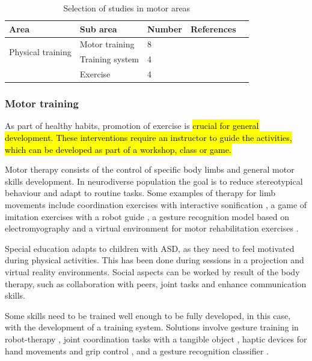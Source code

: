 \documentclass[a4paper,fleqn]{cas-sc}
\begin{document}
\begin{table}[h]
\centering
\begin{center}
\begin{tabular*}{6.2in}{p{0.85in}|p{0.82in}|p{0.35in}|p{3.5in}p{0in}}
\hline
Area   & Sub area   & Number & References  &  \\ \hline
\multirow{2}{*}{Physical training}
    & Motor training & 8 & \cite{Soprani22, Hocking22, Cibrian21, Syahputra21, Santos20, Bansode19, Lee18, Cornejo17}  &  \\  \cline{2-4}
    & Training system   & 4   & \cite{Fassina22, Giraud21, Zhao21, Oprea17}  & 
    \\ \cline{2-4}
    & Exercise  & 4   & \cite{Baharin19, MarquezSegura19, Ardalan19, Bittner17}    &  \\\cline{1-4}
\end{tabular*}
\caption{Selection of studies in motor areas}
\label{TABLE:area-motor}
\end{center}
\end{table}

\subsubsection{Motor training}
\label{sec:app-contexts-motor}
As part of healthy habits, promotion of exercise is \hl{crucial for general development. These interventions require an instructor to guide the activities, which can be developed as part of a workshop, class or game.}

Motor therapy consists of the control of specific body limbs and general motor skills development. In neurodiverse population the goal is to reduce stereotypical behaviour and adapt to routine tasks. Some examples of therapy for limb movements include coordination exercises with interactive sonification \cite{Cibrian21}, a game of imitation exercises with a robot guide \cite{Santos20}, a gesture recognition model based on electromyography \cite{Syahputra21} and a virtual environment for motor rehabilitation exercises \cite{Soprani22}.

Special education adapts to children with ASD, as they need to feel motivated during physical activities. This has been done during sessions in a projection \cite{Cornejo17} and virtual \cite{Hocking22} reality environments.
Social aspects can be worked by result of the body therapy, such as collaboration with peers, joint tasks and enhance communication skills.


Some skills need to be trained well enough to be fully developed, in this case, with the development of a training system. Solutions involve gesture training in robot-therapy \cite{Fassina22}, joint coordination tasks with a tangible object \cite{Giraud21}, haptic devices for hand movements and grip control \cite{Zhao21}, and a gesture recognition classifier \cite{Oprea17}.
\end{document}

